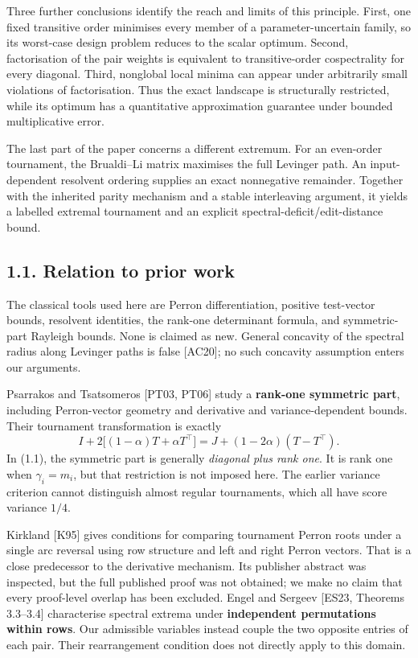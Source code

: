 \documentclass[
  11pt,
  a4paper,
]{article}
\begin{document}
Three further conclusions identify the reach and limits of this
principle. First, one fixed transitive order minimises every member of a
parameter-uncertain family, so its worst-case design problem reduces to
the scalar optimum. Second, factorisation of the pair weights is
equivalent to transitive-order cospectrality for every diagonal. Third,
nonglobal local minima can appear under arbitrarily small violations of
factorisation. Thus the exact landscape is structurally restricted,
while its optimum has a quantitative approximation guarantee under
bounded multiplicative error.

The last part of the paper concerns a different extremum. For an
even-order tournament, the Brualdi--Li matrix maximises the full
Levinger path. An input-dependent resolvent ordering supplies an exact
nonnegative remainder. Together with the inherited parity mechanism and
a stable interleaving argument, it yields a labelled extremal tournament
and an explicit spectral-deficit/edit-distance bound.

\subsection{1.1. Relation to prior work}\label{relation-to-prior-work}

The classical tools used here are Perron differentiation, positive
test-vector bounds, resolvent identities, the rank-one determinant
formula, and symmetric-part Rayleigh bounds. None is claimed as new.
General concavity of the spectral radius along Levinger paths is false
{[}AC20{]}; no such concavity assumption enters our arguments.

Psarrakos and Tsatsomeros {[}PT03, PT06{]} study a \textbf{rank-one
symmetric part}, including Perron-vector geometry and derivative and
variance-dependent bounds. Their tournament transformation is exactly \[
 I+2\big[(1-\alpha)T+\alpha T^\top\big]
   =J+(1-2\alpha)(T-T^\top).                                  \tag{1.2}
\] In (1.1), the symmetric part is generally \emph{diagonal plus rank
one}. It is rank one when \(\gamma_i=m_i\), but that restriction is not
imposed here. The earlier variance criterion cannot distinguish almost
regular tournaments, which all have score variance \(1/4\).

Kirkland {[}K95{]} gives conditions for comparing tournament Perron
roots under a single arc reversal using row structure and left and right
Perron vectors. That is a close predecessor to the derivative mechanism.
Its publisher abstract was inspected, but the full published proof was
not obtained; we make no claim that every proof-level overlap has been
excluded. Engel and Sergeev {[}ES23, Theorems 3.3--3.4{]} characterise
spectral extrema under \textbf{independent permutations within rows}.
Our admissible variables instead couple the two opposite entries of each
pair. Their rearrangement condition does not directly apply to this
domain.
\end{document}
